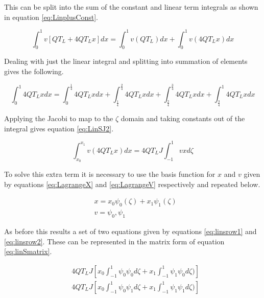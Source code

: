\documentclass[11pt]{article}
\begin{document}
This can be split into the sum of the constant and linear term integrals as shown in equation \ref{eq:LinplusConst}.

\begin{equation}
\label{eq:LinplusConst}
\int_{0}^{1}v\left [ QT_L + 4QT_Lx \right ] dx = \int_{0}^{1}v (QT_L) dx + \int_{0}^{1}v(4QT_Lx) dx
\end{equation}

Dealing with just the linear integral and splitting into summation of elements gives the following.

\begin{equation*}
\int_0^1 4QT_Lx dx = \int_0^\frac{1}{4} 4QT_Lx dx + \int_\frac{1}{4}^\frac{2}{4}4QT_Lx  dx + \int_\frac{2}{4}^\frac{3}{4}  4QT_Lx dx + \int_\frac{3}{4}^1 4QT_Lx dx
\end{equation*}


Applying the Jacobi to map to the $\zeta$ domain and taking constants out of the integral gives equation \ref{eq:LinSJ2}.

\begin{equation}
\label{eq:LinSJ2}
\int_{x_0}^{x_1}v(4QT_Lx) dx = 4QT_L J\int_{-1}^1 vxd \zeta
\end{equation}

To solve this extra term it is necessary to use the basis function for $x$ and $v$ given by equations \ref{eq:LagrangeX} and \ref{eq:LagrangeV} respectively and repeated below.

\begin{align*}
&x = x_{0}\psi_{0}(\zeta) + x_1\psi_{1}(\zeta) \\
&v = \psi_{0}, \psi_{1}
\end{align*}

As before this results a set of two equations given by equations \ref{eq:linsrow1} and \ref{eq:linsrow2}. These can be represented in the matrix form of equation \ref{eq:linSmatrix}.


\begin{subequations}
\label{eq:linSsim}
\begin{align}
&4QT_LJ \left  [x_0 \int_{-1}^{1} \psi_{0} \psi_{0} d \zeta + x_1 \int_{-1}^{1} \psi_{1} \psi_{0} d\zeta ) \right ] \label{eq:linsrow1} \\
&4QT_LJ  \left  [x_0 \int_{-1}^{1} \psi_{0} \psi_{1} d \zeta + x_1 \int_{-1}^{1} \psi_{1} \psi_{1} d\zeta ) \right ]  \label{eq:linsrow2} 
\end{align}
\end{subequations}
\end{document}
